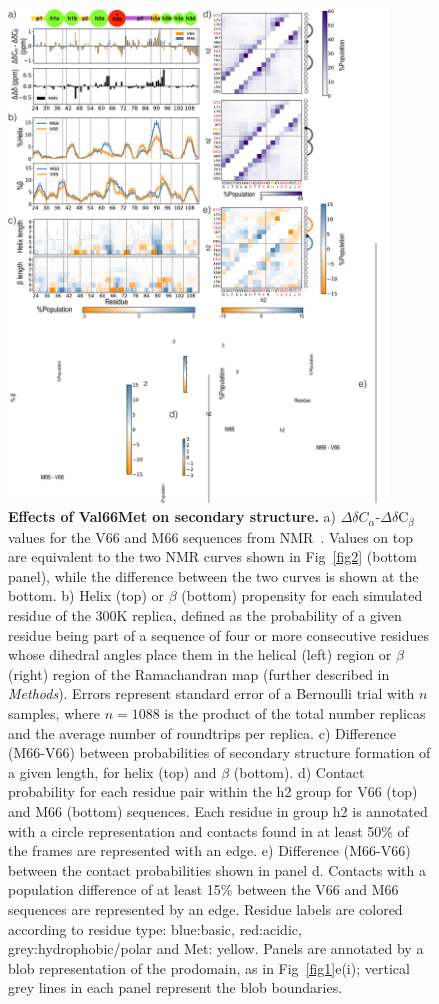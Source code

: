 \documentclass[10pt,letterpaper]{article}
\begin{document}
\begin{figure}[!ht]
\includegraphics[scale=0.5,width=0.9\textwidth,trim={0 0cm 0 0cm},clip]{./figures/fig3.pdf}
\caption{{\bf Effects of Val66Met on secondary structure.} a) $\Delta$$\delta$$C_{\alpha}$-$\Delta$$\delta$C$_{\beta}$ values for the V66 and M66 sequences from NMR~\cite{Anastasia2013}. Values on top are equivalent to the two NMR curves shown in Fig~\ref{fig2} (bottom panel), while the difference between the two curves is shown at the bottom. b) Helix (top) or $\beta$ (bottom) propensity for each simulated residue of the 300K replica, defined as the probability of a given residue being part of a sequence of four or more consecutive residues whose dihedral angles place them in the helical (left) region or $\beta$ (right) region of the Ramachandran map (further described in {\it Methods}). Errors represent standard error of a Bernoulli trial with $n$ samples, where $n = 1088$ is the product of the total number replicas and the average number of roundtrips per replica. c) Difference (M66-V66) between probabilities of secondary structure formation of a given length, for helix (top) and $\beta$ (bottom). d) Contact probability for each residue pair within the h2 group for V66 (top) and M66 (bottom) sequences. Each residue in group h2 is annotated with a circle representation and contacts found in at least 50\% of the frames are represented with an edge. e) Difference (M66-V66) between the contact probabilities shown in panel d. Contacts with a population difference of at least 15\% between the V66 and M66 sequences are represented by an edge. Residue labels are colored according to residue type: blue:basic, red:acidic, grey:hydrophobic/polar and Met: yellow. Panels are annotated by a blob representation of the prodomain, as in Fig~\ref{fig1}e(i); vertical grey lines in each panel represent the blob boundaries. }
\label{fig3} 
\end{figure}
\end{document}
